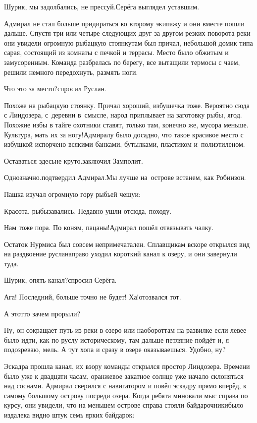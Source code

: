\diagdash Шурик, мы задолбались, не прессуй.\mdash Серёга выглядел уставшим.

Адмирал не стал больше придираться ко второму экипажу и они вместе пошли дальше. Спустя три или четыре следующих друг за другом резких поворота реки они увидели огромную рыбацкую стоянку\mdash там был причал, небольшой домик типа сарая, состоящий из комнаты с печкой и террасы. Место было обжитым и замусоренным. Команда разбрелась по берегу, все вытащили термосы с чаем, решили немного передохнуть, размять ноги.

\diagdash Что это за место?\mdash спросил Руслан.

\diagdash Похоже на рыбацкую стоянку. Причал хороший, избушечка тоже. Вероятно сюда с Линдозера, с~деревни в~смысле, народ приплывает на заготовку рыбы, ягод. Похожие избы в тайге охотники ставят, только там, конечно же, мусора меньше. Культура, мать их за ногу!\mdash Адмиралу было досадно, что такое красивое место с избушкой испорчено всякими банками, бутылками, пластиком и~полиэтиленом.

\diagdash Оставаться здесь\mdash не круто.\mdash заключил Замполит.

\diagdash Однозначно.\mdash подтвердил Адмирал.\mdash Мы лучше на~острове встанем, как Робинзон.

Пашка изучал огромную гору рыбьей чешуи:

\diagdash Красота, рыбы\mdash завались. Недавно ушли отсюда, походу.

\diagdash Нам тоже пора. По коням, пацаны!\mdash Адмирал пошёл отвязывать чалку.

Остаток Нурмиса был совсем непримечатален. Сплавщикам вскоре открылся вид на раздвоение русла\mdash направо уходил короткий канал к озеру, и они завернули туда.

\diagdash Шурик, опять канал?\mdash спросил Серёга.

\diagdash Ага! Последний, больше точно не будет! Ха!\mdash отозвался тот.

\diagdash А этот\sdash то зачем прорыли? 

\diagdash Ну, он сокращает путь из реки в озеро или наоборот\mdash там на развилке если левее было идти, как по руслу историческому, там дальше петляние пойдёт и, я подозреваю, мель. А тут хопа и сразу в озере оказываешься. Удобно, ну?

Эскадра прошла канал, их взору команды открылся простор Линдозера. Времени было уже к двадцати часам, оранжевое закатное солнце уже начало склоняться над соснами. Адмирал сверился с навигатором и повёл эскадру прямо вперёд, к самому большому острову посреди озера. Когда ребята миновали мыс справа по курсу, они увидели, что на меньшем острове справа стояли байдарочники\mdash было издалека видно штук семь ярких байдарок:


